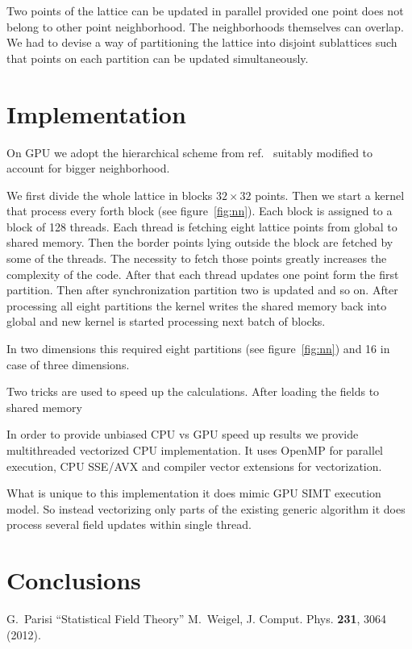 \documentclass[a4paper]{llncs}
\begin{document}
Two points of the lattice can be updated in parallel provided one
point does not belong to other point neighborhood. The neighborhoods
themselves can overlap.  We had to devise a way of partitioning the
lattice into disjoint sublattices such that points on each partition
can be updated simultaneously.

\section{Implementation}

On GPU we adopt the hierarchical scheme from
ref.~\cite{weigel} suitably modified to account for bigger neighborhood.

We first divide the whole lattice in blocks $32\times 32$
points. Then we start a kernel that process every forth block (see
figure~\ref{fig:nn}).  Each block is assigned to a block of 128
threads. Each thread is fetching eight lattice points from global to
shared memory. Then the border points lying outside the block are
fetched by some of the threads. The necessity to fetch those points
greatly increases the complexity of the code. After that each thread
updates one point form the first partition. Then after
synchronization partition two is updated and so on. After processing
all eight partitions the kernel writes the shared memory back into
global and new kernel is started processing next batch of blocks.

In two dimensions this required eight partitions (see
figure~\ref{fig:nn}) and 16 in case of three dimensions.

Two tricks are used to speed up the calculations. After loading the
fields to shared memory

In order to provide unbiased CPU vs GPU speed up results we provide
multithreaded vectorized CPU implementation. It uses OpenMP for parallel
execution, CPU SSE/AVX and compiler vector extensions for vectorization.

What is unique to this implementation it does mimic GPU SIMT execution model.
So instead vectorizing only parts of the existing generic algorithm it does
process several field updates within single thread.

\section{Conclusions}

\begin{thebibliography}{9}
 G.~Parisi ``Statistical Field Theory''
 M.~Weigel, J. Comput. Phys. \textbf{231}, 3064 (2012).
\end{thebibliography}
\end{document}
